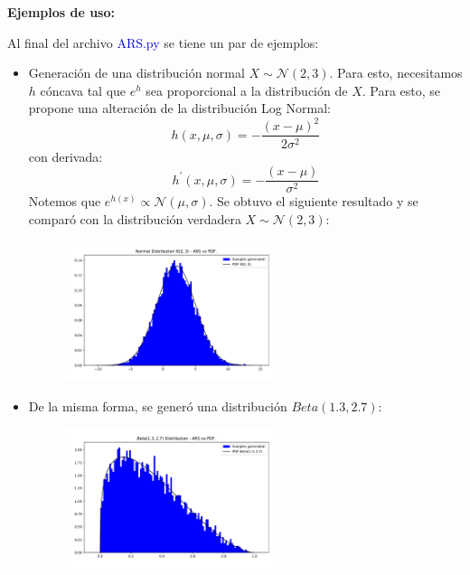\textbf{Ejemplos de uso:}
	
Al final del archivo \textcolor{mediumblue}{ARS.py} se tiene un par de ejemplos:
\begin{itemize}
	\item Generación de una distribución normal $X\sim\mathcal{N}(2,3)$. Para esto, necesitamos $h$ cóncava tal que $e^{h}$ sea proporcional a la distribución de $X$. Para esto, se propone una alteración de la distribución Log Normal:
	\begin{equation}
		h(x,\mu,\sigma) = -\frac{(x-\mu)^2}{2\sigma^{2}}
	\end{equation}
	con derivada:
	\begin{equation}
		h^{'}(x, \mu, \sigma) = -\frac{(x-\mu)}{\sigma^2}
	\end{equation}
	Notemos que $e^{h(x)} \propto \mathcal{N}(\mu,\sigma)$. Se obtuvo el siguiente resultado y se comparó con la distribución verdadera $X\sim\mathcal{N}(2,3)$:
	
	\begin{figure}[h!]
		\centering
		\includegraphics[width=0.59\textwidth]{IMAGENES/ARS_example1.pdf}
	\end{figure}
	
	\item De la misma forma, se generó una distribución $Beta(1.3,2.7)$:
	\begin{figure}[h!]
		\centering
		\includegraphics[width=0.59\textwidth]{IMAGENES/ARS_example2.pdf}
	\end{figure}
\end{itemize}

